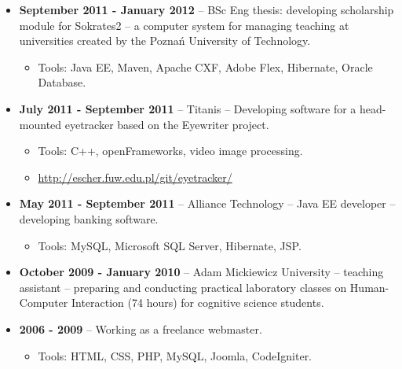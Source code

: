 \documentclass[10pt]{article}
\renewcommand{\section}[2]%
        {\pagebreak[2]\vspace{1.3\baselineskip}%
         \phantomsection\addcontentsline{toc}{section}{#1}%
         \hspace{0in}%
         \marginpar{
         \raggedright \scshape #1}#2}
\newenvironment{outerlist}[1][\enskip\textbullet]%
        {\begin{itemize}[#1]}{\end{itemize}%
         \vspace{-.6\baselineskip}}
\begin{document}
\begin{outerlist}
\item[] \textbf{September 2011 - January 2012} -- BSc Eng thesis: developing scholarship module for Sokrates2 -- a computer
system for managing teaching at universities created by the Poznań University of Technology.
\begin{itemize}
  \item Tools: Java EE, Maven, Apache CXF, Adobe Flex, Hibernate, Oracle Database.
\end{itemize}

\item[] \textbf{July 2011 - September 2011} -- Titanis -- Developing software for a head-mounted eyetracker based on the Eyewriter project.
\begin{itemize}
  \item Tools: C++, openFrameworks, video image processing.
  \item \url{http://escher.fuw.edu.pl/git/eyetracker/}
\end{itemize}

\item[] \textbf{May 2011 - September 2011} -- Alliance Technology -- Java EE developer -- developing banking software.
\begin{itemize}
  \item Tools: MySQL, Microsoft SQL Server, Hibernate, JSP.
\end{itemize}

\item[] \textbf{October 2009 - January 2010} -- Adam Mickiewicz University -- teaching assistant --
preparing and conducting practical laboratory classes on Human-Computer Interaction
(74 hours) for cognitive science students.

\item[] \textbf{2006 - 2009} -- Working as a freelance webmaster. 
\begin{itemize}
  \item Tools: HTML, CSS, PHP, MySQL, Joomla, CodeIgniter.%
\end{itemize}


\end{outerlist}

\end{document}
